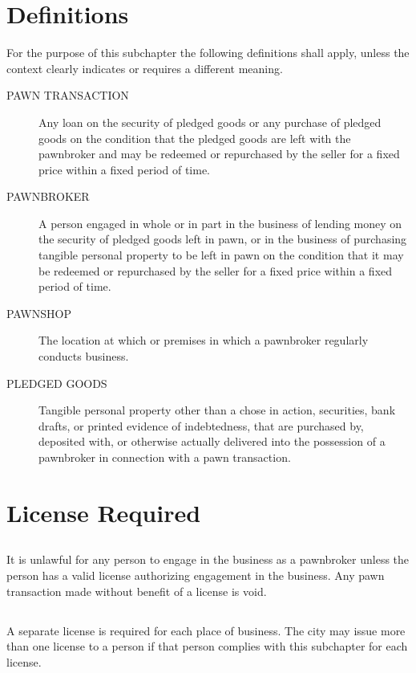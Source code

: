 
\setcounter{section}{29}
\section{Definitions}
For the purpose of this subchapter the following definitions shall apply, unless the context clearly indicates or requires a different meaning.
\begin{description}
    \item[PAWN TRANSACTION] Any loan on the security of pledged goods or any purchase of pledged goods on the condition that the pledged goods are left with the pawnbroker and may be redeemed or repurchased by the seller for a fixed price within a fixed period of time.
    \item[PAWNBROKER] A person engaged in whole or in part in the business of lending money on the security of pledged goods left in pawn, or in the business of purchasing tangible personal property to be left in pawn on the condition that it may be redeemed or repurchased by the seller for a fixed price within a fixed period of time.
    \item[PAWNSHOP] The location at which or premises in which a pawnbroker regularly conducts business.
    \item[PLEDGED GOODS] Tangible personal property other than a chose in action, securities, bank drafts, or printed evidence of indebtedness, that are purchased by, deposited with, or otherwise actually delivered into the possession of a pawnbroker in connection with a pawn transaction.
\end{description}

\section{License Required}
\subsection{}
It is unlawful for any person to engage in the business as a pawnbroker unless the person has a valid license authorizing engagement in the business. Any pawn transaction made without benefit of a license is void.
\subsection{}
A separate license is required for each place of business. The city may issue more than one license to a person if that person complies with this subchapter for each license.
